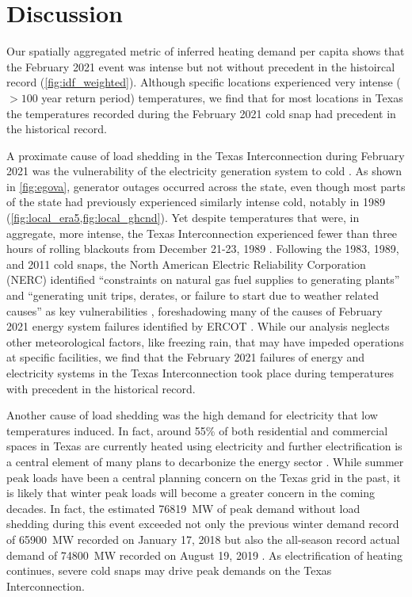 \documentclass[12pt]{iopart}
\begin{document}
\section{Discussion}

Our spatially aggregated metric of inferred heating demand per capita shows that the February 2021 event was intense but not without precedent in the histoircal record (\cref{fig:idf_weighted}).
Although specific locations experienced very intense ($>100$ year return period) temperatures, we find that for most locations in Texas the temperatures recorded during the February 2021 cold snap had precedent in the historical record.

A proximate cause of load shedding in the Texas Interconnection during February 2021 was the vulnerability of the electricity generation system to cold \cite{everhart_iea:2021}.
As shown in \cref{fig:egova}, generator outages occurred across the state, even though most parts of the state had previously experienced similarly intense cold, notably in 1989 (\cref{fig:local_era5,fig:local_ghcnd}).
Yet despite temperatures that were, in aggregate, more intense, the Texas Interconnection experienced fewer than three hours of rolling blackouts from December 21-23, 1989 \cite{nerc_operation:1989,osborne_twofreezes:2021}.
Following the 1983, 1989, and 2011 cold snaps, the North American Electric Reliability Corporation (NERC) identified ``constraints on natural gas fuel supplies to generating plants'' and ``generating unit trips, derates, or failure to start due to weather related causes'' as key vulnerabilities \cite{nerc_previous:2013}, foreshadowing many of the causes of February 2021 energy system failures identified by ERCOT \cite{ercotpublic_outagesv2:2021,magness_review:2021}.
While our analysis neglects other meteorological factors, like freezing rain, that may have impeded operations at specific facilities, we find that the February 2021 failures of energy and electricity systems in the Texas Interconnection took place during temperatures with precedent in the historical record.

Another cause of load shedding was the high demand for electricity that low temperatures induced.
In fact, around 55\% of both residential and commercial spaces in Texas are currently heated using electricity \cite{waite_heating:2020} and further electrification is a central element of many plans to decarbonize the energy sector \cite{williams_decarbonization:2012,davis:2018,white_txresidential:2019}.
While summer peak loads have been a central planning concern on the Texas grid in the past, it is likely that winter peak loads will become a greater concern in the coming decades.
In fact, the estimated \SI{76819}{\mega\watt} of peak demand without load shedding during this event \cite{magness_review:2021} exceeded not only the previous winter demand record of \SI{65900}{\mega\watt} recorded on January 17, 2018 but also the all-season record actual demand of \SI{74800}{\mega\watt} recorded on August 19, 2019 \cite{everhart_iea:2021}.
As electrification of heating continues, severe cold snaps may drive peak demands on the Texas Interconnection.
\end{document}
